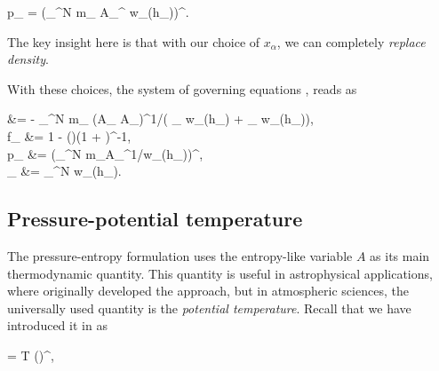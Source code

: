 \documentclass[../main.tex]{subfiles}
\begin{document}
\begin{equations}[single,!,numberline=all]
	\label{eq:PRESSURE-ENTROPY-PRESSURE}
	p_{\alpha} = \left(\sum_{}^N m_{\beta} A_{\beta}^{} w_{\alpha\beta}(h_{\alpha})\right)^{\gamma}.
\end{equations}

The key insight here is that with our choice of $x_{\alpha}$, we can completely \emph{replace density}.

With these choices, the system of governing equations ,  reads as

\begin{equations}[columns,!,numberline=all]
	\label{eq:PRESSURE-ENTROPY-TOTAL}
	 &= - \sum_{}^N m_{\beta} \left(A_{\alpha} A_{\beta}\right)^{1/\gamma}\left( \nabla_{\alpha} w_{\alpha\beta}\left(h_{\alpha}\right) +  \nabla_{\alpha} w_{\alpha\beta}\left(h_{\beta}\right)\right), \\
	f_{\alpha \beta} &= 1 - \left(\right)\left(1 + \right)^{-1}, \\
	p_{\alpha} &= \left(\sum_{}^N m_{\beta}A_{\beta}^{1/\gamma}w_{\alpha \beta}\left(h_{\alpha}\right)\right)^{\gamma}, \\
	_{\alpha} &= \sum_{}^N w_{\alpha \beta}\left(h_{\alpha}\right).
\end{equations}

\subsection{Pressure-potential temperature}
\label{sec:DI-pressure-theta}

The pressure-entropy formulation  uses the entropy-like variable $A$ as its main thermodynamic quantity. This quantity is useful in astrophysical applications, where \autocite{hopkinsGeneralClassLagrangian2013a} originally developed the approach, but in atmospheric sciences, the universally used quantity is the \emph{potential temperature}. Recall that we have introduced it in  as 

\begin{equations}[single,*]
\theta = T \left(\right)^{},
\end{equations}
\end{document}
